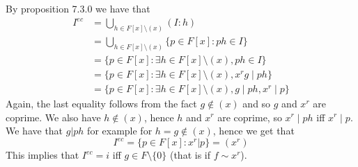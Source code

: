 \documentclass{article}
\begin{document}
By proposition 7.3.0 we have that
\begin{align*}
	I^{ec} &= \bigcup_{h \in F[x]\setminus(x)} (I : h)\\
	&= \bigcup_{h \in F[x]\setminus(x)} \{p \in F[x] : ph \in I \}\\
	&= \{p \in F[x] : \exists h \in F[x]\setminus(x), ph \in I \}\\
	&= \{p \in F[x] : \exists h \in F[x]\setminus(x), x^rg \mid ph \}\\
	&= \{p \in F[x] : \exists h \in F[x]\setminus(x), g \mid ph,
	x^r \mid p \}
\end{align*}
Again, the last equality follows from the fact $g \not\in (x)$ and so 
$g$ and $x^r$ are coprime. We also have $h \not\in (x)$, hence $h$ and
$x^r$ are coprime, so $x^r \mid ph$ iff $x^r \mid p$.
We have that $g | ph$ for example for $h = g \not\in (x)$, hence we get
that
\begin{equation*}
	I^{ec} = \{p \in F[x] : x^r | p\} = (x^r)
\end{equation*}
This implies that $I^{ec} = i$ iff $g \in F\setminus\{0\}$ (that is if $f \sim x^r$).
\end{document}
